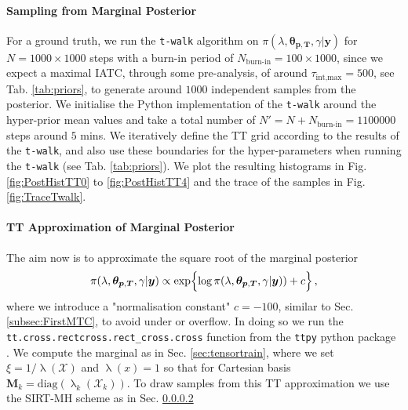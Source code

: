 \paragraph{Sampling from Marginal Posterior}
For a ground truth, we run the \texttt{t-walk} \cite{christen2010general} algorithm on $\pi( \lambda,\bm{\theta}_{\bm{p}, \bm{T}},\gamma  | \bm{y})$ for $N = 1000 \times 1000$ steps with a burn-in period of $N_{\text{burn-in}} = 100 \times 1000 $, since we expect a maximal IATC, through some pre-analysis, of around $\tau_{\text{int,max}} = 500$, see Tab. \ref{tab:priors}, to generate around $1000$ independent samples from the posterior.
We initialise the Python implementation of the \texttt{t-walk}\cite{christentwalkaccess} around the hyper-prior mean values and take a total number of $N' =N + N_{\text{burn-in}} = 1100000$ steps around $5$ mins.
We iteratively define the TT grid according to the results of the \texttt{t-walk}, and also use these boundaries for the hyper-parameters when running the \texttt{t-walk} (see Tab. \ref{tab:priors}).
We plot the resulting histograms in Fig. \ref{fig:PostHistTT0} to \ref{fig:PostHistTT4} and the trace of the samples in Fig. \ref{fig:TraceTwalk}.

\paragraph{TT Approximation of Marginal Posterior}
The aim now is to approximate the square root of the marginal posterior
\begin{align}
	\begin{split}
		\pi( \lambda,\bm{\theta}_{\bm{p}, \bm{T}},\gamma  | \bm{y}) \propto  \exp\Bigl\{\log{\pi( \lambda,\bm{\theta}_{\bm{p}, \bm{T}},\gamma  | \bm{y}) ) } + c \Bigr\}  
	\end{split} \, ,
	\label{eq:MargPostFullTT}
\end{align}
where we introduce a "normalisation constant" $c=-100$, similar to Sec. \ref{subsec:FirstMTC}, to avoid under or overflow.
In doing so we run the \texttt{tt.cross.rectcross.rect\_cross.cross} function from the \texttt{ttpy} python package \cite{Oseledets2018ttpy}.
We compute the marginal as in Sec. \ref{sec:tensortrain}, where we set $\xi = 1 / \uplambda (\mathcal{X})$ and $\uplambda(x) = 1$ so that for Cartesian basis $\bm{M}_k = \text{diag}(\uplambda_k(\mathcal{X}_k))$.
To draw samples from this TT approximation we use the SIRT-MH scheme as in Sec. \ref{}


